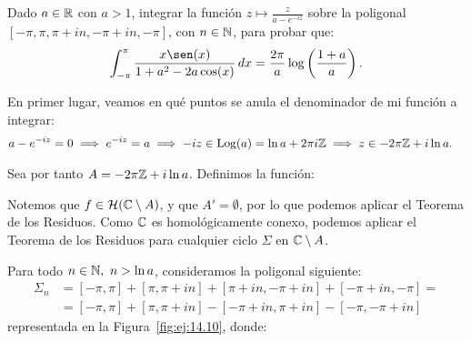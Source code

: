 \begin{ejercicio}\label{ej:14.10}
    Dado $a \in \mathbb{R}$ con $a > 1$, integrar la función $z \mapsto \frac{z}{a - e^{-i z}}$ sobre la poligonal $\left[-\pi, \pi, \pi + i n, -\pi + i n, -\pi\right]$, con $n \in \mathbb{N}$, para probar que:
    \begin{equation*}
        \int_{-\pi}^{\pi} \frac{x\sen(x)}{1 + a^2 - 2a\cos(x)} \, dx = \frac{2\pi}{a}\log\left(\frac{1 + a}{a}\right).
    \end{equation*}

    En primer lugar, veamos en qué puntos se anula el denominador de mi función a integrar:
    \begin{align*}
        a - e^{-i z} &= 0 \implies e^{-i z} = a \implies -iz\in \operatorname{Log}(a)=\ln a + 2\pi i \mathbb{Z}
        \implies z \in -2\pi \mathbb{Z} + i\ln a.
    \end{align*}

    Sea por tanto $A = -2\pi \mathbb{Z} + i\ln a$. Definimos la función:

    Notemos que $f\in \mathcal{H}(\mathbb{C}\setminus A)$, y que $A'=\emptyset$, por lo que podemos aplicar el Teorema de los Residuos. Como $\mathbb{C}$ es homológicamente conexo, podemos aplicar el Teorema de los Residuos para cualquier ciclo $\Sigma$ en $\mathbb{C}\setminus A$.
    
    Para todo $n \in \mathbb{N},~n>\ln a$, consideramos la poligonal siguiente:
    \begin{align*}
        \Sigma_n &= [-\pi, \pi] + [\pi, \pi + i n] + [\pi + i n, -\pi + i n] + [-\pi + i n, -\pi]
        =\\&= [-\pi, \pi] + [\pi, \pi + i n] - [-\pi + i n, \pi + i n] - [-\pi, -\pi + i n]
    \end{align*}
    representada en la Figura~\ref{fig:ej:14.10}, donde:
    \begin{figure}
        \centering
\end{figure}
\end{ejercicio}
